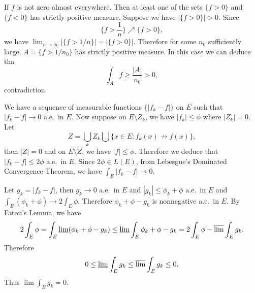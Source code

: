 \begin{exercise}{5.21}
If $f$ is not zero almost everywhere.
Then at least one of the sets $\{f>0\}$ and $\{f<0\}$ has strictly positive measure.
Suppose we have $|\{f>0\}|>0$.
Since \[\{f>\frac{1}{n}\}\nearrow\{f>0\},\]
we have $\lim_{n\rightarrow\infty}|\{f>1/n\}|=|\{f>0\}|$.
Therefore for some $n_0$ sufficiently large,
$A=\{f>1/n_0\}$ has strictly positive measure.
In this case we can deduce tha\[\int_A f\geq\frac{|A|}{n_0}>0, \] contradiction.
\end{exercise}

\begin{exercise}{5.22}
We have a sequence of measurable functions $\{|f_k-f|\}$ on $E$
such that $|f_k-f|\rightarrow 0$ a.e.\ in $E$.
Now suppose on $E\setminus Z_k$, we have $|f_k|\leq \phi$ where $|Z_k|=0$.
Let \[Z=\bigcup_k Z_k\bigcup\{x\in E:f_k(x)\not\rightarrow f(x)\},\]
then $|Z|=0$ and on $E\setminus Z$,
we have $|f|\leq \phi$.
Therefore we deduce that $|f_k-f|\leq 2\phi$ a.e.\ in $E$.
Since $2\phi\in L(E)$, from Lebesgue's Dominated Convergence Theorem,
we have $\int_E|f_k-f|\rightarrow 0.$
\end{exercise}

\begin{exercise}{5.23}
Let $g_k=|f_k-f|$, then $g_k\rightarrow 0$ a.e.\ in $E$
and $|g_k|\leq \phi_k+\phi$ a.e.\ in $E$
and $\int_E(\phi_k+\phi)\rightarrow 2\int_E\phi.$
Therefore $\phi_k+\phi-g_k$ is nonnegative a.e.\ in $E$.
By Fatou's Lemma, we have
\[2\int_E\phi=\int_E\varliminf(\phi_k+\phi-g_k)\leq\varliminf\int_E\phi_k+\phi-g_k=2\int_E\phi-\varlimsup\int_Eg_k.\]
Therefore \[0\leq\varliminf\int_E g_k\leq\varlimsup\int_Eg_k\leq 0.\]
Thus $\lim\int_Eg_k=0.$
\end{exercise}

